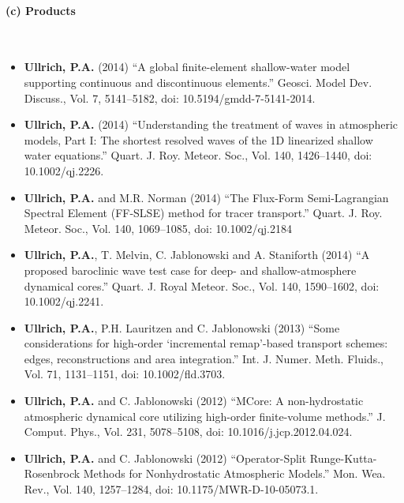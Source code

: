 \documentclass[11pt]{article}
\begin{document}
\vspace{-0.3cm}
\paragraph{\large (c) Products}\ \\
\vspace{-0.8cm}
\begin{itemize}
\item \textbf{Ullrich, P.A.} (2014) ``A global finite-element shallow-water model supporting continuous and discontinuous elements.''  Geosci. Model Dev. Discuss., Vol. 7, 5141--5182, doi: 10.5194/gmdd-7-5141-2014.

\item \textbf{Ullrich, P.A.} (2014) ``Understanding the treatment of waves in atmospheric models, Part I: The shortest resolved waves of the 1D linearized shallow water equations.'' Quart. J. Roy. Meteor. Soc., Vol. 140, 1426--1440, doi: 10.1002/qj.2226. 

\item \textbf{Ullrich, P.A.} and M.R. Norman (2014) ``The Flux-Form Semi-Lagrangian Spectral Element (FF-SLSE) method for tracer transport.'' Quart. J. Roy. Meteor. Soc., Vol. 140, 1069--1085, doi: 10.1002/qj.2184

\item \textbf{Ullrich, P.A.}, T. Melvin, C. Jablonowski and A. Staniforth (2014) {``A proposed baroclinic wave test case for deep- and shallow-atmosphere dynamical cores.''}  Quart. J. Royal Meteor. Soc., Vol. 140, 1590--1602, doi: 10.1002/qj.2241. 

\item \textbf{Ullrich, P.A.}, P.H. Lauritzen and C. Jablonowski (2013) {``Some considerations for high-order `incremental remap'-based transport schemes: edges, reconstructions and area integration.''}  Int. J. Numer. Meth. Fluids., Vol. 71, 1131--1151, doi: 10.1002/fld.3703.

\item \textbf{Ullrich, P.A.} and C. Jablonowski (2012) {``MCore: A non-hydrostatic atmospheric dynamical core utilizing high-order finite-volume methods.''}  J. Comput. Phys., Vol. 231, 5078--5108, doi: 10.1016/j.jcp.2012.04.024.

\item \textbf{Ullrich, P.A.} and C. Jablonowski (2012) {``Operator-Split Runge-Kutta-Rosenbrock Methods for Nonhydrostatic Atmospheric Models.''} Mon. Wea. Rev., Vol. 140, 1257--1284, doi: 10.1175/MWR-D-10-05073.1. 


\end{itemize}
\end{document}
